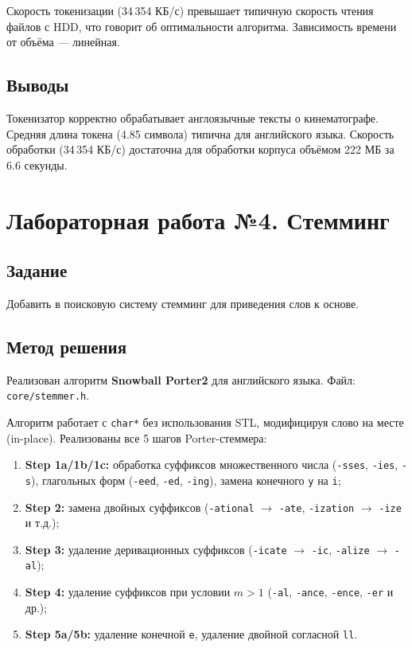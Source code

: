 \documentclass[a4paper,12pt]{article}
\begin{document}
Скорость токенизации (34\,354 КБ/с) превышает типичную скорость чтения файлов с HDD, что говорит об оптимальности алгоритма. Зависимость времени от объёма --- линейная.

\subsection{Выводы}

Токенизатор корректно обрабатывает англоязычные тексты о кинематографе. Средняя длина токена (4.85 символа) типична для английского языка. Скорость обработки (34\,354 КБ/с) достаточна для обработки корпуса объёмом 222 МБ за 6.6 секунды.


\newpage
\section{Лабораторная работа №4. Стемминг}

\subsection{Задание}

Добавить в поисковую систему стемминг для приведения слов к основе.

\subsection{Метод решения}

Реализован алгоритм \textbf{Snowball Porter2} для английского языка. Файл: \texttt{core/stemmer.h}.

Алгоритм работает с \texttt{char*} без использования STL, модифицируя слово на месте (in-place). Реализованы все 5 шагов Porter-стеммера:

\begin{enumerate}
    \item \textbf{Step 1a/1b/1c:} обработка суффиксов множественного числа (\texttt{-sses}, \texttt{-ies}, \texttt{-s}), глагольных форм (\texttt{-eed}, \texttt{-ed}, \texttt{-ing}), замена конечного \texttt{y} на \texttt{i};
    \item \textbf{Step 2:} замена двойных суффиксов (\texttt{-ational} $\rightarrow$ \texttt{-ate}, \texttt{-ization} $\rightarrow$ \texttt{-ize} и т.д.);
    \item \textbf{Step 3:} удаление деривационных суффиксов (\texttt{-icate} $\rightarrow$ \texttt{-ic}, \texttt{-alize} $\rightarrow$ \texttt{-al});
    \item \textbf{Step 4:} удаление суффиксов при условии $m > 1$ (\texttt{-al}, \texttt{-ance}, \texttt{-ence}, \texttt{-er} и др.);
    \item \textbf{Step 5a/5b:} удаление конечной \texttt{e}, удаление двойной согласной \texttt{ll}.
\end{enumerate}
\end{document}
